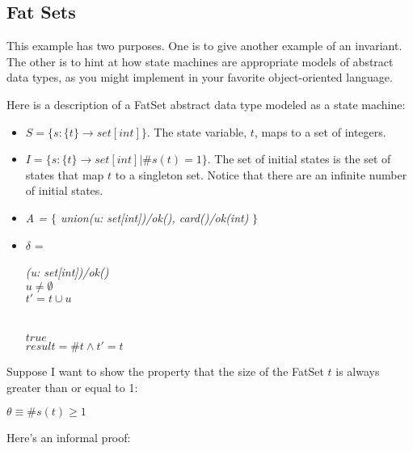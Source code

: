 \subsection{Fat Sets}
This example has two purposes.
One is
to give another example of an invariant.  The other is
to hint at how state machines are appropriate models of abstract
data types, as you might implement in your favorite object-oriented language.

Here is a description of a FatSet abstract data
type modeled as a state machine:
\begin{itemize}
\item$S = \{ s: \{t\} \rightarrow set[int] \}$.
The state variable, $t$, maps to a set of integers.

\item $I = \{ s: \{t\} \rightarrow set[int] | \#s(t) = 1 \}$.
The set of initial states is the set of states that
map $t$ to a singleton set.  Notice that there are an infinite number
of initial states.

\item {\em A = $\{$ union(u: set[int])/ok(), card()/ok(int)} $\}$

\item $\delta$ =

\begin{spec}
\begin{tabbing}
\={\em(u: set[int])/ok()}\\
              $u \neq \emptyset$\\
              $t' = t \cup u$\\
 \\
\\
              $true$\\
              $result = \#t \wedge t' = t $
\end{tabbing}
\end{spec}

\end{itemize}

Suppose I want to show the property that the size of the
FatSet $t$ is always greater than or equal to 1:

\begin{center}
$\theta \equiv \#s(t) \geq 1$
\end{center}

Here's an informal proof:


